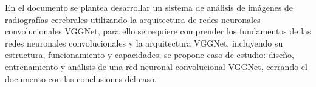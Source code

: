 \documentclass[12pt,twoside,titlepage]{ingenius}
\begin{document}
\begin{multicols}{2}
En el documento se plantea desarrollar un sistema de análisis de imágenes de radiografías cerebrales utilizando la arquitectura de redes neuronales convolucionales VGGNet, para ello se requiere comprender los fundamentos de las redes neuronales convolucionales y la arquitectura VGGNet, incluyendo su estructura, funcionamiento y capacidades; se propone caso de estudio: diseño, entrenamiento y análisis de una red neuronal convolucional VGGNet, cerrando el documento con las conclusiones del caso.   

%
%
%
%
%
%
%

\end{multicols}
\end{document}
